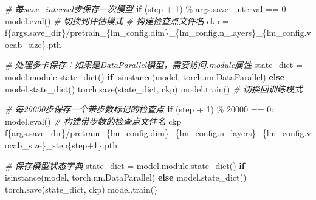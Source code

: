 \documentclass[
]{article}
\newenvironment{Shaded}{}{}
\newcommand{\BuiltInTok}[1]{\textcolor[rgb]{0.00,0.50,0.00}{#1}}
\newcommand{\CommentTok}[1]{\textcolor[rgb]{0.38,0.63,0.69}{\textit{#1}}}
\newcommand{\ControlFlowTok}[1]{\textcolor[rgb]{0.00,0.44,0.13}{\textbf{#1}}}
\newcommand{\DecValTok}[1]{\textcolor[rgb]{0.25,0.63,0.44}{#1}}
\newcommand{\NormalTok}[1]{#1}
\newcommand{\OperatorTok}[1]{\textcolor[rgb]{0.40,0.40,0.40}{#1}}
\newcommand{\SpecialCharTok}[1]{\textcolor[rgb]{0.25,0.44,0.63}{#1}}
\newcommand{\SpecialStringTok}[1]{\textcolor[rgb]{0.73,0.40,0.53}{#1}}
\begin{document}
\begin{Shaded}
\begin{Highlighting}[]
        \CommentTok{\# 每save\_interval步保存一次模型}
        \ControlFlowTok{if}\NormalTok{ (step }\OperatorTok{+} \DecValTok{1}\NormalTok{) }\OperatorTok{\%}\NormalTok{ args.save\_interval }\OperatorTok{==} \DecValTok{0}\NormalTok{:}
\NormalTok{            model.}\BuiltInTok{eval}\NormalTok{()  }\CommentTok{\# 切换到评估模式}
            \CommentTok{\# 构建检查点文件名}
\NormalTok{            ckp }\OperatorTok{=} \SpecialStringTok{f\textquotesingle{}}\SpecialCharTok{\{}\NormalTok{args}\SpecialCharTok{.}\NormalTok{save\_dir}\SpecialCharTok{\}}\SpecialStringTok{/pretrain\_}\SpecialCharTok{\{}\NormalTok{lm\_config}\SpecialCharTok{.}\NormalTok{dim}\SpecialCharTok{\}}\SpecialStringTok{\_}\SpecialCharTok{\{}\NormalTok{lm\_config}\SpecialCharTok{.}\NormalTok{n\_layers}\SpecialCharTok{\}}\SpecialStringTok{\_}\SpecialCharTok{\{}\NormalTok{lm\_config}\SpecialCharTok{.}\NormalTok{vocab\_size}\SpecialCharTok{\}}\SpecialStringTok{.pth\textquotesingle{}}

            \CommentTok{\# 处理多卡保存：如果是DataParallel模型，需要访问.module属性}
\NormalTok{            state\_dict }\OperatorTok{=}\NormalTok{ model.module.state\_dict() }\ControlFlowTok{if} \BuiltInTok{isinstance}\NormalTok{(model, torch.nn.DataParallel) }\ControlFlowTok{else}\NormalTok{ model.state\_dict()}
\NormalTok{            torch.save(state\_dict, ckp)}
\NormalTok{            model.train()  }\CommentTok{\# 切换回训练模式}
        
        \CommentTok{\# 每20000步保存一个带步数标记的检查点}
        \ControlFlowTok{if}\NormalTok{ (step }\OperatorTok{+} \DecValTok{1}\NormalTok{) }\OperatorTok{\%} \DecValTok{20000} \OperatorTok{==} \DecValTok{0}\NormalTok{:}
\NormalTok{            model.}\BuiltInTok{eval}\NormalTok{()}
            \CommentTok{\# 构建带步数的检查点文件名}
\NormalTok{            ckp }\OperatorTok{=} \SpecialStringTok{f\textquotesingle{}}\SpecialCharTok{\{}\NormalTok{args}\SpecialCharTok{.}\NormalTok{save\_dir}\SpecialCharTok{\}}\SpecialStringTok{/pretrain\_}\SpecialCharTok{\{}\NormalTok{lm\_config}\SpecialCharTok{.}\NormalTok{dim}\SpecialCharTok{\}}\SpecialStringTok{\_}\SpecialCharTok{\{}\NormalTok{lm\_config}\SpecialCharTok{.}\NormalTok{n\_layers}\SpecialCharTok{\}}\SpecialStringTok{\_}\SpecialCharTok{\{}\NormalTok{lm\_config}\SpecialCharTok{.}\NormalTok{vocab\_size}\SpecialCharTok{\}}\SpecialStringTok{\_step}\SpecialCharTok{\{}\NormalTok{step}\OperatorTok{+}\DecValTok{1}\SpecialCharTok{\}}\SpecialStringTok{.pth\textquotesingle{}}

            \CommentTok{\# 保存模型状态字典}
\NormalTok{            state\_dict }\OperatorTok{=}\NormalTok{ model.module.state\_dict() }\ControlFlowTok{if} \BuiltInTok{isinstance}\NormalTok{(model, torch.nn.DataParallel) }\ControlFlowTok{else}\NormalTok{ model.state\_dict()}
\NormalTok{            torch.save(state\_dict, ckp)}
\NormalTok{            model.train()}



\end{Highlighting}
\end{Shaded}
\end{document}
